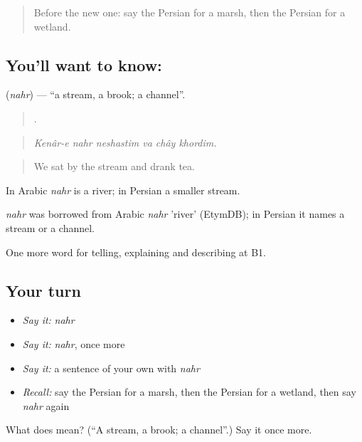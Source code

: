 \begin{quote}
Before the new one: say the Persian for a marsh, then the Persian for a wetland.
\end{quote}

\subsection*{You'll want to know: }
\textbf{} (\emph{nahr}) — \textquotedblleft{}a stream, a brook; a channel\textquotedblright{}.

\begin{quote}
     .
\end{quote}

\begin{quote}
\emph{Kenâr-e nahr neshastim va chây khordim.}
\end{quote}

\begin{quote}
We sat by the stream and drank tea.
\end{quote}

In Arabic \emph{nahr} is a river; in Persian a smaller stream.

\begin{cousinweb}
\emph{nahr} was borrowed from Arabic \emph{nahr} 'river' (EtymDB); in Persian it names a stream or a channel.
\end{cousinweb}

\begin{grammarlens}[title={What you've built}]
One more word for telling, explaining and describing at B1.
\end{grammarlens}

\subsection*{Your turn}
\begin{itemize}
\raggedright
  \item \emph{Say it:} \emph{nahr}
  \item \emph{Say it:} \emph{nahr}, once more
  \item \emph{Say it:} a sentence of your own with \emph{nahr}
  \item \emph{Recall:} say the Persian for a marsh, then the Persian for a wetland, then say \emph{nahr} again
\end{itemize}

\begin{tcolorbox}[breakable,colback=teal!4,colframe=teal!35!black,title={Before you move on}]
What does  mean? (\textquotedblleft{}A stream, a brook; a channel\textquotedblright{}.) Say it once more.
\end{tcolorbox}
